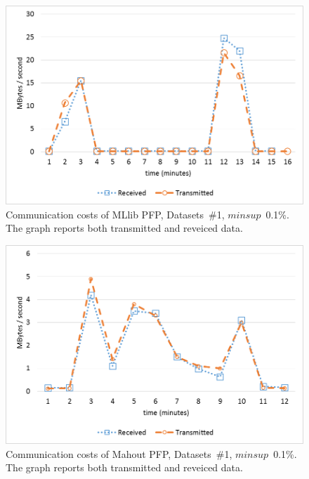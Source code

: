 \begin{figure}[!t]
\begin{center}
\includegraphics[width=5in]{chapters/survey/immagini/comm_costs_mllib.png}
\caption{Communication costs of MLlib PFP, Datasets~\#1, $minsup$~0.1\%.
The graph reports both transmitted and reveiced data.}
\label{comm_costs_mllib}
\end{center}
\end{figure}

\begin{figure}[!t]
\begin{center}
\includegraphics[width=5in]{chapters/survey/immagini/comm_costs_pfp.png}
\caption{Communication costs of Mahout PFP, Datasets~\#1, $minsup$~0.1\%.
The graph reports both transmitted and reveiced data.
}
\label{comm_costs_pfp}
\end{center}
\end{figure}





